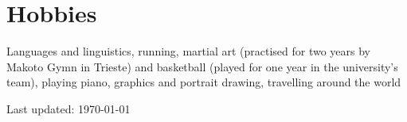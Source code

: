 \documentclass[letterpaper]{article}
\def\footerlink{}%
\begin{document}
\section*{Hobbies}
Languages and linguistics, running, martial art (practised for two years by Makoto Gymn in Trieste) and basketball (played for one year in the university's team), playing piano, graphics and portrait drawing, travelling around the world

\fi


\bigskip

\begin{center}
  \begin{footnotesize}
    Last updated: \today \\
    \href{\footerlink}{\texttt{\footerlink}}
  \end{footnotesize}
\end{center}
\end{document}
